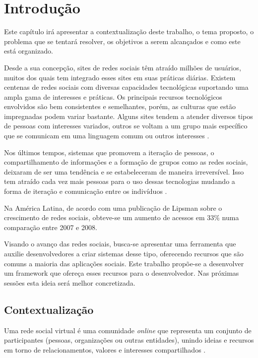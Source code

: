 \chapter[Introdução]{Introdução}

Este capítulo irá apresentar a contextualização deste trabalho, o tema proposto, o problema que se tentará resolver, os objetivos a serem alcançados e como este está organizado.

Desde a sua concepção, sites de redes sociais têm atraído milhões de usuários, muitos dos quais tem integrado esses sites em suas práticas diárias. Existem centenas de redes sociais com diversas capacidades tecnológicas suportando uma ampla gama de interesses e práticas. Os principais recursos tecnológicos envolvidos são bem consistentes e semelhantes, porém, as culturas que estão impregnadas podem variar bastante. Alguns sites tendem a atender diversos tipos de pessoas com interesses variados, outros se voltam a um grupo mais específico que se comunicam em uma linguagem comum ou outros interesses \cite{Boyd:Ellison:2007}.

Nos últimos tempos, sistemas que promovem a iteração de pessoas, o compartilhamento de informações e a formação de grupos como as redes sociais, deixaram de ser uma tendência e se estabeleceram de maneira irreversível. Isso tem atraído cada vez mais pessoas para o uso dessas tecnologias mudando a forma de iteração e comunicação entre os indivíduos \cite{Santana:Melo-Solarte:Neris:Miranda:Baranauskas:2009}.

Na América Latina, de acordo com uma publicação de Lipsman \cite{Lipsman:2008} sobre o crescimento de redes sociais, obteve-se um aumento de acessos em 33\% numa comparação entre 2007 e 2008.

Visando o avanço das redes sociais, busca-se apresentar uma ferramenta que auxilie desenvolvedores a criar sistemas desse tipo, oferecendo recursos que são comuns a maioria das aplicações sociais. Este trabalho propõe-se a desenvolver um framework que ofereça esses recursos para o desenvolvedor. Nas próximas sessões esta ideia será melhor concretizada.

\section{Contextualização}

Uma rede social virtual é uma comunidade \textit{online} que representa um conjunto de participantes (pessoas, organizações ou outras entidades), unindo ideias e recursos em torno de relacionamentos, valores e interesses compartilhados \cite{Marteleto:2001}.

